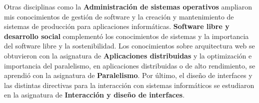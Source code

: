 Otras disciplinas como la \textbf{Administración de sistemas operativos} ampliaron mis conocimientos de gestión de software y la creación y mantenimiento de sistemas de producción para aplicaciones informáticas. \textbf{Software libre y desarrollo social} complementó los conocimientos de sistemas y la importancia del software libre y la sostenibilidad.
Los conocimientos sobre arquitectura web se obtuvieron con la asignatura de \textbf{Aplicaciones distribuidas} y la optimización e importancia del paralelismo, en aplicaciones distribuidas o de alto rendimiento, se aprendió con la asignatura de \textbf{Paralelismo}. Por último, el diseño de interfaces y las distintas directivas para la interacción con sistemas informáticos se estudiaron en la asignatura de \textbf{Interacción y diseño de interfaces}.